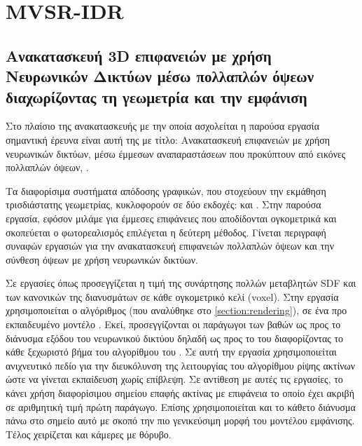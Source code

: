 \label{sota}
\section{MVSR-IDR}
\label{section:idr}
\subsection*{Ανακατασκευή 3D επιφανειών με χρήση Νευρωνικών Δικτύων μέσω πολλαπλών όψεων διαχωρίζοντας τη γεωμετρία και την εμφάνιση}
\par
    Στο πλαίσιο της  ανακατασκευής με την οποία ασχολείται η παρούσα εργασία σημαντική έρευνα είναι αυτή της  με τίτλο: Ανακατασκευή επιφανειών με χρήση νευρωνικών δικτύων, μέσω έμμεσων αναπαραστάσεων που προκύπτουν από εικόνες πολλαπλών όψεων, \cite[Multiview neural surface reconstruction by disentangling geometry and appearance]{yariv2020multiview}.
\par
    Τα διαφορίσιμα συστήματα απόδοσης γραφικών, που στοχεύουν την εκμάθηση τρισδιάστατης γεωμετρίας, κυκλοφορούν σε δύο εκδοχές:  και . Στην παρούσα εργασία, εφόσον μιλάμε για έμμεσες επιφάνειες που αποδίδονται ογκομετρικά και σκοπεύεται ο φωτορεαλισμός επιλέγεται η δεύτερη μέθοδος. Γίνεται περιγραφή συναφών εργασιών για την ανακατασκευή επιφανειών πολλαπλών όψεων και την σύνθεση όψεων με χρήση νευρωνικών δικτύων. 
\par 
     Σε εργασίες όπως \cite{jiang2022sdfdiff} προσεγγίζεται η τιμή της συνάρτησης πολλών μεταβλητών SDF και των κανονικών της διανυσμάτων σε κάθε ογκομετρικό κελί (voxel). Στην εργασία \cite{liu2020dist} χρησιμοποιείται ο αλγόριθμος  (που αναλύθηκε στο \ref{section:rendering}), σε ένα προ εκπαιδευμένο  μοντέλο  \cite{park2019deepsdf}. Εκεί, προσεγγίζονται οι παράγωγοι των βαθών ως προς το διάνυσμα εξόδου του  νευρωνικού δικτύου δηλαδή ως προς το του διαφορίζοντας το κάθε ξεχωριστό βήμα του αλγορίθμου του .  Σε αυτή την εργασία \cite{liu2019learning} χρησιμοποιείται ανιχνευτικό πεδίο για την διευκόλυνση της λειτουργίας του αλγορίθμου ρίψης ακτίνων ώστε να γίνεται εκπαίδευση χωρίς επίβλεψη. Σε αντίθεση με αυτές τις εργασίες, το  κάνει χρήση διαφορίσιμου σημείου επαφής ακτίνας με επιφάνεια το οποίο έχει ακριβή σε αριθμητική τιμή πρώτη παράγωγο. Επίσης χρησιμοποιείται και το κάθετο διάνυσμα πάνω στο σημείο αυτό με σκοπό την πιο γενικεύσιμη μορφή του μοντέλου εμφάνισης. Τέλος χειρίζεται και κάμερες με θόρυβο. 

